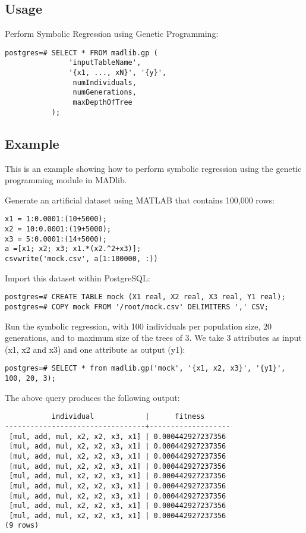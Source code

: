 \subsection*{Usage}
Perform Symbolic Regression using Genetic Programming:
\begin{verbatim}
postgres=# SELECT * FROM madlib.gp (
               'inputTableName', 
               '{x1, ..., xN}', '{y}', 
                numIndividuals, 
                numGenerations, 
                maxDepthOfTree
           );
\end{verbatim}

\subsection*{Example}
This is an example showing how to perform symbolic regression using the genetic programming module in MADlib. 

\vspace{\baselineskip}
{\raggedleft Generate an artificial dataset using MATLAB that contains 100,000 rows:}

\lstset{language=Matlab}
\lstset{tabsize=4}
\begin{lstlisting}
x1 = 1:0.0001:(10+5000);
x2 = 10:0.0001:(19+5000);
x3 = 5:0.0001:(14+5000);
a =[x1; x2; x3; x1.*(x2.^2+x3)];
csvwrite('mock.csv', a(1:100000, :))
\end{lstlisting}

{\raggedleft Import this dataset within PostgreSQL:}
\begin{verbatim}
postgres=# CREATE TABLE mock (X1 real, X2 real, X3 real, Y1 real);
postgres=# COPY mock FROM '/root/mock.csv' DELIMITERS ',' CSV;
\end{verbatim}

{\raggedleft Run the symbolic regression, with 100 individuals per population size, 20 generations, and to maximum size of the trees of 3. We take 3 attributes as input (x1, x2 and x3) and one attribute as output (y1):}

\begin{verbatim}
postgres=# SELECT * from madlib.gp('mock', '{x1, x2, x3}', '{y1}', 100, 20, 3);
\end{verbatim}

{\raggedleft The above query produces the following output:}
\begin{verbatim}
           individual            |      fitness
---------------------------------+-------------------
 [mul, add, mul, x2, x2, x3, x1] | 0.000442927237356
 [mul, add, mul, x2, x2, x3, x1] | 0.000442927237356
 [mul, add, mul, x2, x2, x3, x1] | 0.000442927237356
 [mul, add, mul, x2, x2, x3, x1] | 0.000442927237356
 [mul, add, mul, x2, x2, x3, x1] | 0.000442927237356
 [mul, add, mul, x2, x2, x3, x1] | 0.000442927237356
 [mul, add, mul, x2, x2, x3, x1] | 0.000442927237356
 [mul, add, mul, x2, x2, x3, x1] | 0.000442927237356
 [mul, add, mul, x2, x2, x3, x1] | 0.000442927237356
(9 rows)
\end{verbatim}

